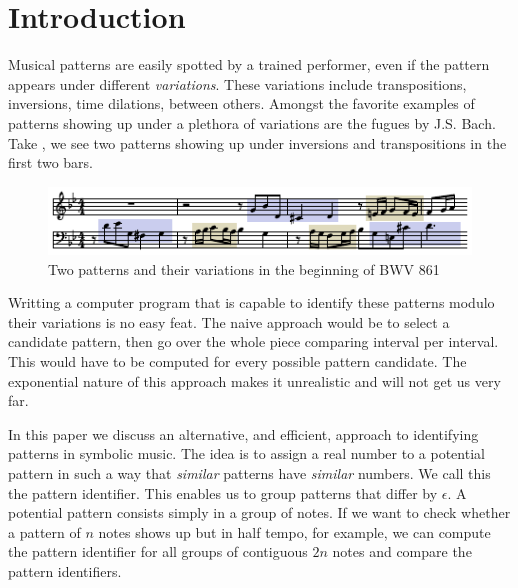 \newcommand{\victor}[1]{{\color{blue}\textbf{[victor:}\textit{#1}\textbf{]}}}
\newcommand{\dimbc}{\mathrm{dim}^{\mathrm{BC}}}

\section{Introduction}
\label{sec:intro}

  Musical patterns are easily spotted by a trained performer,
even if the pattern appears under different \emph{variations}.  These
variations include transpositions, inversions, time dilations, between
others. Amongst the favorite examples of patterns showing up under a
plethora of variations are the fugues by J.S. Bach. Take
, we see two patterns showing up under
inversions and transpositions in the first two bars.

\begin{figure}
  \includegraphics[width=\linewidth]{src/img/bwv861-start-section-patterns.pdf}
  \caption{Two patterns and their variations in the beginning of BWV 861}
  \label{fig:egbach}
\end{figure}

  Writting a computer program that is capable to identify these
patterns modulo their variations is no easy feat. The naive approach
would be to select a candidate pattern, then go over the whole
piece comparing interval per interval. This would have to be computed
for every possible pattern candidate. The exponential nature of this
approach makes it unrealistic and will not get us very far.

  In this paper we discuss an alternative, and efficient, approach to
identifying patterns in symbolic music. The idea is to assign a real
number to a potential pattern in such a way that \emph{similar}
patterns have \emph{similar} numbers. We call this the pattern
identifier.  This enables us to group patterns that differ by
$\epsilon$.  A potential pattern consists simply in a group of
notes. If we want to check whether a pattern of $n$ notes shows up but
in half tempo, for example, we can compute the pattern identifier for
all groups of contiguous $2n$ notes and compare the pattern
identifiers.  

